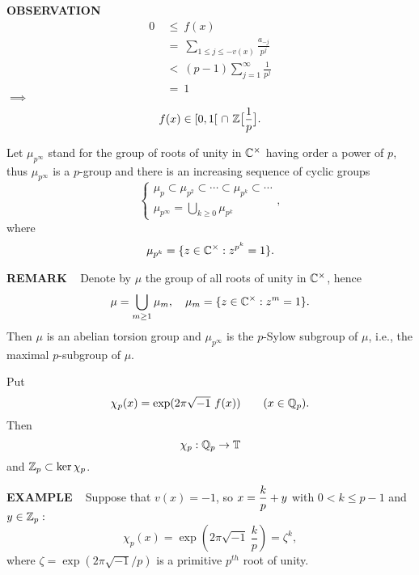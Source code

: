 \begin{x}{\small\bf OBSERVATION} \ %
\begin{align*}
0 \ 
&\leq \ f(x) \\
&= \ \sum\limits_{1 \le j \le -v(x)} \frac{a_{-j}}{p^j} \\
&<\  (p-1) \sum_{j = 1}^\infty \frac{1}{p^j}\\ 
&=\  1 
\end{align*}
\qquad\qquad\qquad\qquad$\implies$
\[
f(x) \in [0,1[ \ \cap \  \mathbb{Z}\bigl[\frac{1}{p}\bigr].
\]

Let $\mu_{p^\infty}$ stand for the group of roots of unity in $\mathbb{C}^\times$ having order a power of $p$, 
thus $\mu_{p^\infty}$ is a $p$-group and there is an increasing sequence of cyclic groups
\[
\begin{cases}
\mu_p \subset \mu_{p^2} \subset \cdots \subset \mu_{p^k} \subset  \cdots \\
\mu_{p^\infty} = \bigcup\limits_{k \ge 0}  \mu_{p^k} 
\end{cases}
,
\]
where
\[
 \mu_{p^k}  = \{z \in \mathbb{C}^\times : z^{p^k} = 1\}.
\]
\end{x}

\vspace{0.1cm}

\begin{x}{\small\bf REMARK} \ %
Denote by $\mu$ the group of all roots of unity in $\mathbb{C}^\times$, hence
\[
\mu = \bigcup\limits_{m \ge 1}  \mu_m, \quad \mu_m = \{z \in \mathbb{C}^\times : z^m = 1\}.
\]
Then $\mu$ is an abelian torsion group and $\mu_{p^\infty}$ is the $p$-Sylow subgroup of $\mu$, 
i.e., the maximal $p$-subgroup of $\mu$.
\vspace{0.2cm}

Put
\[
\chi_p(x) = \exp(2\pi \sqrt{-1} \ f(x)) \qquad ( x \in \Q_p).
\]
Then
\[
\chi_p: \mathbb{Q}_p \rightarrow \mathbb{T}
\]
and $\mathbb{Z}_p \subset \ker \chi_p$.
\end{x}

\vspace{0.1cm}

\begin{x}{\small\bf EXAMPLE} \ %
Suppose that $v(x) = -1$, so $x = \displaystyle\frac{k}{p} + y$ with $0 < k \le p-1$ and $y \in \mathbb{Z}_p:$
\[
\chi_p(x) = \exp(2\pi \sqrt{-1} \ \frac{k}{p}) = \zeta^k,
\]
where $\zeta = \exp(2\pi \sqrt{-1}/p)$ is a primitive $p^{th}$ root of unity.
\end{x}

\vspace{0.1cm}

